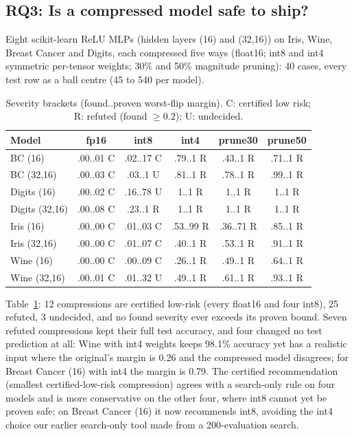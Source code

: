 \documentclass[conference]{IEEEtran}
\begin{document}
\subsection{RQ3: Is a compressed model safe to ship?}
Eight scikit-learn ReLU MLPs (hidden layers (16) and (32,16)) on Iris, Wine, Breast Cancer and Digits, each compressed five ways (float16; int8 and int4 symmetric per-tensor weights; 30\% and 50\% magnitude pruning): 40 cases, every test row as a ball centre (45 to 540 per model).

\begin{table}[t]
\centering
\caption{Severity brackets (found..proven worst-flip margin). C: certified low risk; R: refuted (found $\ge0.2$); U: undecided.}
\label{tab:shrink}
\setlength{\tabcolsep}{2.4pt}
\begin{tabular}{lccccc}
\toprule
Model & fp16 & int8 & int4 & prune30 & prune50\\
\midrule
BC (16) & .00..01 C & .02..17 C & .79..1 R & .43..1 R & .71..1 R\\
BC (32,16) & .00..03 C & .03..1 U & .81..1 R & .78..1 R & .99..1 R\\
Digits (16) & .00..02 C & .16..78 U & 1..1 R & 1..1 R & 1..1 R\\
Digits (32,16) & .00..08 C & .23..1 R & 1..1 R & 1..1 R & 1..1 R\\
Iris (16) & .00..00 C & .01..03 C & .53..99 R & .36..71 R & .85..1 R\\
Iris (32,16) & .00..00 C & .01..07 C & .40..1 R & .53..1 R & .91..1 R\\
Wine (16) & .00..00 C & .00..09 C & .26..1 R & .49..1 R & .64..1 R\\
Wine (32,16) & .00..01 C & .01..32 U & .49..1 R & .61..1 R & .93..1 R\\
\bottomrule
\end{tabular}
\end{table}

Table~\ref{tab:shrink}: 12 compressions are certified low-risk (every float16 and four int8), 25 refuted, 3 undecided, and no found severity ever exceeds its proven bound. Seven refuted compressions kept their full test accuracy, and four changed no test prediction at all: Wine with int4 weights keeps 98.1\% accuracy yet has a realistic input where the original's margin is 0.26 and the compressed model disagrees; for Breast Cancer (16) with int4 the margin is 0.79. The certified recommendation (smallest certified-low-risk compression) agrees with a search-only rule on four models and is more conservative on the other four, where int8 cannot yet be proven safe; on Breast Cancer (16) it now recommends int8, avoiding the int4 choice our earlier search-only tool made from a 200-evaluation search.
\end{document}
